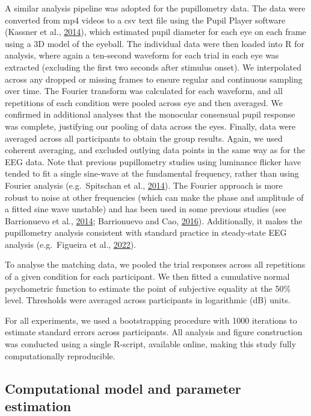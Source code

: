 \documentclass[
]{article}
\begin{document}
A similar analysis pipeline was adopted for the pupillometry data. The data were converted from mp4 videos to a csv text file using the Pupil Player software (Kassner et al., \protect\hyperlink{ref-Kassner2014}{2014}), which estimated pupil diameter for each eye on each frame using a 3D model of the eyeball. The individual data were then loaded into R for analysis, where again a ten-second waveform for each trial in each eye was extracted (excluding the first two seconds after stimulus onset). We interpolated across any dropped or missing frames to ensure regular and continuous sampling over time. The Fourier transform was calculated for each waveform, and all repetitions of each condition were pooled across eye and then averaged. We confirmed in additional analyses that the monocular consensual pupil response was complete, justifying our pooling of data across the eyes. Finally, data were averaged across all participants to obtain the group results. Again, we used coherent averaging, and excluded outlying data points in the same way as for the EEG data. Note that previous pupillometry studies using luminance flicker have tended to fit a single sine-wave at the fundamental frequency, rather than using Fourier analysis (e.g.~Spitschan et al., \protect\hyperlink{ref-Spitschan2014}{2014}). The Fourier approach is more robust to noise at other frequencies (which can make the phase and amplitude of a fitted sine wave unstable) and has been used in some previous studies (see Barrionuevo et al., \protect\hyperlink{ref-Barrionuevo2014}{2014}; Barrionuevo and Cao, \protect\hyperlink{ref-Barrionuevo2016}{2016}). Additionally, it makes the pupillometry analysis consistent with standard practice in steady-state EEG analysis (e.g.~Figueira et al., \protect\hyperlink{ref-Figueira2022}{2022}).

To analyse the matching data, we pooled the trial responses across all repetitions of a given condition for each participant. We then fitted a cumulative normal psychometric function to estimate the point of subjective equality at the 50\% level. Thresholds were averaged across participants in logarithmic (dB) units.

For all experiments, we used a bootstrapping procedure with 1000 iterations to estimate standard errors across participants. All analysis and figure construction was conducted using a single R-script, available online, making this study fully computationally reproducible.

\hypertarget{computational-model-and-parameter-estimation}{%
\subsection{Computational model and parameter estimation}\label{computational-model-and-parameter-estimation}}
\end{document}
